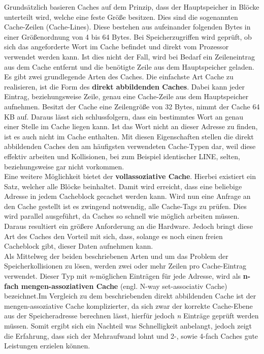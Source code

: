Grundsätzlich basieren Caches auf dem Prinzip, dass der Hauptspeicher in Blöcke unterteilt wird, welche eine feste Größe besitzen. Dies sind die sogenannten Cache-Zeilen (Cache-Lines).
Diese bestehen aus aufeinander folgenden Bytes in einer Größenordnung von 4 bis 64 Bytes. Bei Speicherzugriffen wird geprüft, ob sich das angeforderte Wort im Cache befindet und direkt
vom Prozessor verwendet werden kann. Ist dies nicht der Fall, wird bei Bedarf ein Zeileneintrag aus dem Cache entfernt und die benötigte Zeile aus dem Hauptspeicher geladen. \\
Es gibt zwei grundlegende Arten des Caches. Die einfachste Art Cache zu realisieren, ist die Form des \textbf{direkt abbildenden Caches}. Dabei kann jeder Eintrag, beziehungsweise Zeile, genau
eine Cache-Zeile aus dem Hauptspeicher aufnehmen. Besitzt der Cache eine Zeilengröße von 32 Bytes, nimmt der Cache 64 KB auf. Daraus lässt sich schlussfolgern, dass ein bestimmtes
Wort an genau einer Stelle im Cache liegen kann. Ist das Wort nicht an dieser Adresse zu finden, ist es auch nicht im Cache enthalten.
Mit diesen Eigenschaften stellen die direkt abbildenden Caches den am häufigsten verwendeten Cache-Typen dar, weil diese effektiv arbeiten und Kollisionen, bei zum Beispiel identischer LINE,
selten, beziehungsweise gar nicht vorkommen. \\
Eine weitere Möglichkeit bietet der \textbf{vollassoziative Cache}. Hierbei existiert ein Satz, welcher alle Blöcke beinhaltet. Damit wird erreicht, dass eine beliebige Adresse in jedem
Cacheblock gecachet werden kann. Wird nun eine Anfrage an den Cache gestellt ist es zwingend notwendig, alle Cache-Tags zu prüfen. Dies wird parallel ausgeführt, da Caches so schnell wie
möglich arbeiten müssen. Daraus resultiert ein größere Anforderung an die Hardware. Jedoch bringt diese Art des Caches den Vorteil mit sich, dass, solange es noch einen freien Cacheblock gibt,
dieser Daten aufnehmen kann.\\
Als Mittelweg der beiden beschriebenen Arten und um das Problem der Speicherkollisionen zu lösen, werden zwei oder mehr Zeilen pro Cache-Eintrag verwendet. Dieser Typ mit \emph{n}-möglichen Einträgen für jede Adresse,
 wird als \textbf{n-fach mengen-assoziativen Cache} (engl. N-way set-associativ Cache) bezeichnet.Im Vergleich zu dem beschriebenden direkt abbildenden Cache ist der mengen-assoziative Cache
 komplizierter, da sich zwar der korrekte Cache-Ebene aus der Speicheradresse berechnen lässt, hierfür jedoch \emph{n} Einträge geprüft werden müssen. Somit ergibt sich ein Nachteil
 was Schnelligkeit anbelangt, jedoch zeigt die Erfahrung, dass sich der Mehraufwand lohnt und 2-, sowie 4-fach Caches gute Leistungen erzielen können.~\cite{cache} \\

